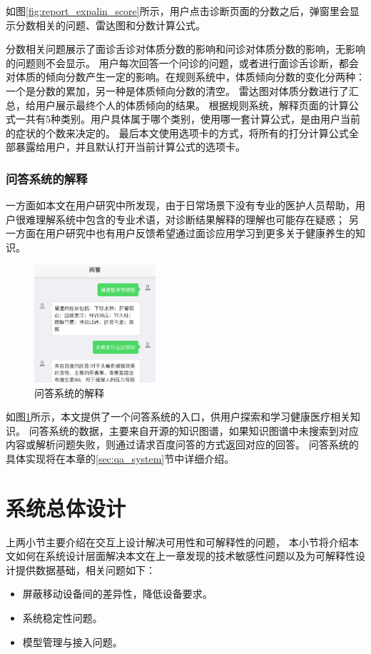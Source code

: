 如图\ref{fig:report_expalin_score}所示，用户点击诊断页面的分数之后，弹窗里会显示分数相关的问题、雷达图和分数计算公式。

分数相关问题展示了面诊舌诊对体质分数的影响和问诊对体质分数的影响，无影响的问题则不会显示。
用户每次回答一个问诊的问题，或者进行面诊舌诊断，都会对体质的倾向分数产生一定的影响。在规则系统中，体质倾向分数的变化分两种：一个是分数的累加，另一种是体质倾向分数的清空。
雷达图对体质分数进行了汇总，给用户展示最终个人的体质倾向的结果。
根据规则系统，解释页面的计算公式一共有5种类别。用户具体属于哪个类别，使用哪一套计算公式，是由用户当前的症状的个数来决定的。
最后本文使用选项卡的方式，将所有的打分计算公式全部暴露给用户，并且默认打开当前计算公式的选项卡。

\subsubsection{问答系统的解释}


一方面如本文在用户研究中所发现，由于日常场景下没有专业的医护人员帮助，用户很难理解系统中包含的专业术语，对诊断结果解释的理解也可能存在疑惑；
另一方面在用户研究中也有用户反馈希望通过面诊应用学习到更多关于健康养生的知识。

\begin{figure}[h]
    \centering
    \includegraphics[width=4.5cm]{images/ans2.png}
    \caption{问答系统的解释}
    \label{fig:explain_qa}
\end{figure}

如图\ref{fig:explain_qa}所示，本文提供了一个问答系统的入口，供用户探索和学习健康医疗相关知识。
问答系统的数据，主要来自开源的知识图谱，如果知识图谱中未搜索到对应内容或解析问题失败，则通过请求百度问答的方式返回对应的回答。
问答系统的具体实现将在本章的\ref{sec:qa_system}节中详细介绍。



\section{系统总体设计}
上两小节主要介绍在交互上设计解决可用性和可解释性的问题，
本小节将介绍本文如何在系统设计层面解决本文在上一章发现的技术敏感性问题以及为可解释性设计提供数据基础，相关问题如下：
\begin{itemize}
    \item 屏蔽移动设备间的差异性，降低设备要求。
    \item 系统稳定性问题。
    \item 模型管理与接入问题。
\end{itemize}

